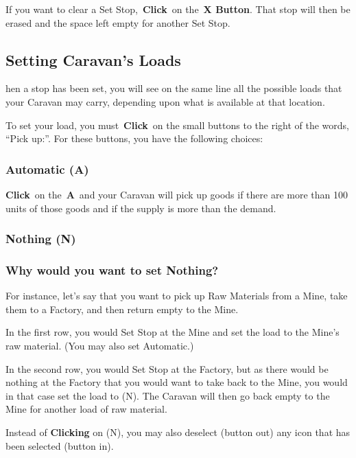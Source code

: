 If you want to clear a Set Stop, \textbf{Click} on the \textbf{X Button}. That stop will then be erased and the space left empty for another Set Stop.

\subsection{Setting Caravan’s Loads}


hen a stop has been set, you will see on the same line all the possible loads that your Caravan may carry, depending upon what is available at that location.

To set your load, you must \textbf{Click} on the small buttons to the right of the words, “Pick up:”. For these buttons, you have the following choices:

\subsubsection{Automatic (A)}

\textbf{Click} on the \textbf{A} and your Caravan will pick up goods if there are more than 100 units of those goods and if the supply is more than the demand.

\subsubsection{Nothing (N)}

\subsubsection{Why would you want to set Nothing?}

For instance, let’s say that you want to pick up Raw Materials from a Mine, take them to a Factory, and then return empty to the Mine.

\begin{changemargin}{.5cm}{0cm}
In the first row, you would Set Stop at the Mine and set the load to the Mine’s raw material. (You may also set Automatic.)

In the second row, you would Set Stop at the Factory, but as there would be nothing at the Factory that you would want to take back to the Mine, you would in that case set the load to (N). The Caravan will then go back empty to the Mine for another load of raw material.

Instead of \textbf{Clicking} on (N), you may also deselect (button out) any icon that has been selected (button in).
\end{changemargin}

